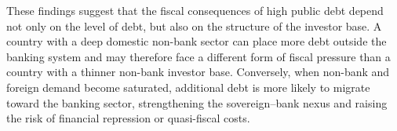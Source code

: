 \documentclass[\latexroot/\projectname]{subfiles}
\begin{document}
These findings suggest that the fiscal consequences of high public debt depend
not only on the level of debt, but also on the structure of the investor base.
A country with a deep domestic non-bank sector can place more debt outside the
banking system and may therefore face a different form of fiscal pressure than a
country with a thinner non-bank investor base. Conversely, when non-bank and
foreign demand become saturated, additional debt is more likely to migrate
toward the banking sector, strengthening the sovereign--bank nexus and raising
the risk of financial repression or quasi-fiscal costs.

\smartbib
\end{document}

